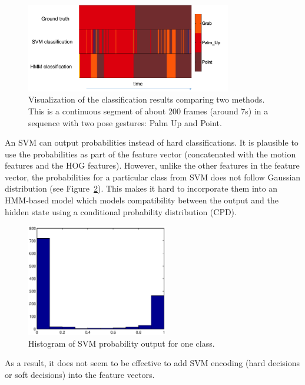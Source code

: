 \begin{figure}[tbh]
\centering
\includegraphics[width=0.8\textwidth]{figures/svm_hmm.png}
\caption{Visualization of the classification results comparing two methods.
This is a continuous segment of about 200 frames (around 7s) in a
sequence with two pose gestures: Palm Up and Point.}
\label{fig:svm-hmm}
\end{figure}

An SVM can output probabilities instead of hard classifications. It is plausible
to use the probabilities as part of the feature vector (concatenated with the
motion features and the HOG features).
However, unlike the other features in the feature vector, the probabilities for a particular class from
SVM does not follow Gaussian distribution (see Figure~\ref{fig:svm}). This
makes it hard to incorporate them into an HMM-based model which models
compatibility between the output and the hidden state using a conditional probability
distribution (CPD).

\begin{figure}[tbh]
\centering
\includegraphics[width=0.55\textwidth]{figures/hist_svm.eps}
\caption{Histogram of SVM probability output for one class.}
\label{fig:svm}
\end{figure}

As a result, it does not seem to be
effective to add SVM encoding (hard decisions or soft decisions) into the
feature vectors.

